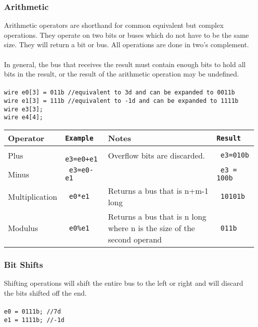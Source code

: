 \documentclass[letterpaper,11pt]{article}
\begin{document}
        \subsubsection{Arithmetic}
        Arithmetic operators are shorthand for common equivalent but complex operations. They operate 
        on two bits or buses which do not have to be the same size. They will return a bit or bus. All 
        operations are done in two's complement.\\\\
        In general, the bus that receives the result must contain enough bits to hold all bits 
        in the result, or the result of the arithmetic operation may be undefined.\\\\
        \texttt{wire e0[3] = 011b //equivalent to 3d and can be expanded to 0011b}\\
        \texttt{wire e1[3] = 111b //equivalent to -1d and can be expanded to 1111b}\\
        \texttt{wire e3[3];}\\
        \texttt{wire e4[4];}\\
        
        \begin{center} 
        \begin{tabular}{|l|>{\texttt\bgroup}l<{\egroup}|p{2in}|>{\texttt\bgroup}l<{\egroup}|}
        \hline
        Operator&Example&Notes&Result\\ \hline
        Plus          	&	e3=e0+e1	&	Overflow bits are discarded.     	&
        e3=010b \\ \hline
        Minus         	&	e3=e0-e1	 &         
                           &	e3 = 100b \\ \hline
        Multiplication	&	e0*e1              &	Returns a bus that is n+m-1 long                                      &
        	10101b                \\ \hline
        Modulus       	&	e0\%e1             	&	Returns a bus that is n long where n is the size 
        of the second operand   &	011b                  \\ \hline
        \end{tabular}
        \end{center}
        
        \subsubsection{Bit Shifts}
        Shifting operations will shift the entire bus to the left or right and will discard the 
        bits shifted off the end.\\\\
        \texttt{e0 = 0111b; //7d}\\
        \texttt{e1 = 1111b; //-1d}\\
        
\end{document}
